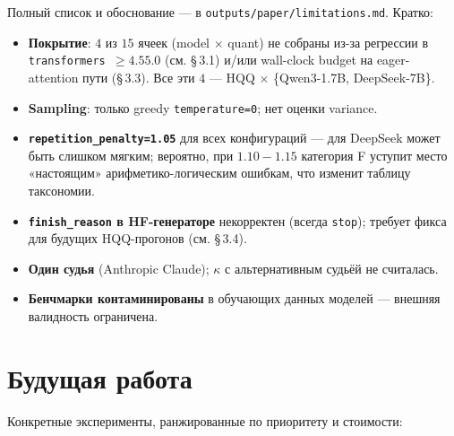 \documentclass[11pt, a4paper]{article}
\newcommand{\code}[1]{\texttt{#1}}
\begin{document}
Полный список и обоснование — в \code{outputs/paper/limitations.md}.
Кратко:
\begin{itemize}[leftmargin=*]
\item \textbf{Покрытие}: $4$ из $15$ ячеек (model $\times$ quant) не
собраны из-за регрессии в \code{transformers $\geq 4.55.0$} (см. §\,3.1)
и/или wall-clock budget на eager-attention пути (§\,3.3). Все эти $4$ —
HQQ $\times$ \{Qwen3-1.7B, DeepSeek-7B\}.
\item \textbf{Sampling}: только greedy \code{temperature=0}; нет оценки
variance.
\item \textbf{\code{repetition\_penalty=1.05}} для всех конфигураций —
для DeepSeek может быть слишком мягким; вероятно, при $1.10{-}1.15$
категория F уступит место «настоящим» арифметико-логическим ошибкам,
что изменит таблицу таксономии.
\item \textbf{\code{finish\_reason} в HF-генераторе} некорректен (всегда
\code{stop}); требует фикса для будущих HQQ-прогонов (см. §\,3.4).
\item \textbf{Один судья} (Anthropic Claude); $\kappa$ с альтернативным
судьёй не считалась.
\item \textbf{Бенчмарки контаминированы} в обучающих данных моделей —
внешняя валидность ограничена.
\end{itemize}

\section{Будущая работа}

Конкретные эксперименты, ранжированные по приоритету и стоимости:
\end{document}
